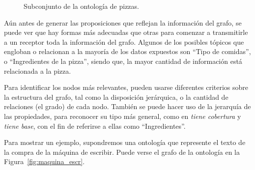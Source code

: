 \begin{figure}
\centering
{}
\caption{Subconjunto de la ontología de pizzas.} \label{fig:pizza.owl}
\end{figure}

Aún antes de generar las proposiciones que reflejan la información del grafo, se puede ver que hay formas más adecuadas que otras para comenzar a transmitirle a un receptor toda la información del grafo. Algunos de los posibles tópicos que engloban o relacionan a la mayoría de los datos expuestos son ``Tipo de comidas'', o ``Ingredientes de la pizza'', siendo que, la mayor cantidad de información está relacionada a la pizza. 

Para identificar los nodos más relevantes, pueden usarse diferentes criterios sobre la estructura del grafo, tal como la disposición jerárquica, o la cantidad de relaciones (el grado) de cada nodo. También se puede hacer uso de la jerarquía de las propiedades, para reconocer su tipo más general, como en \emph{tiene cobertura} y \emph{tiene base}, con el fin de referirse a ellas como ``Ingredientes''.

Para mostrar un ejemplo, supondremos una ontología que represente el texto de la compra de la máquina de escribir. Puede verse el grafo de la ontología en la Figura~\ref{fig:maquina_escr}.


